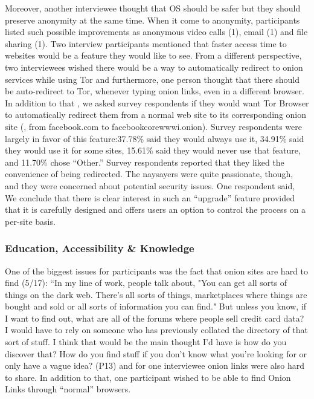 Moreover, another interviewee thought that OS should be safer but they should preserve anonymity at the same time. When it come to anonymity, participants listed such possible improvements as anonymous video calls (1), email (1) and file sharing (1). Two interview participants mentioned that faster access time to websites would be a feature they would like to see. From a different perspective, two interviewees wished there would be a way to automatically redirect to onion services while using Tor and furthermore, one person thought that there should be auto-redirect to Tor, whenever typing onion links, even in a different browser. In addition to that , we asked survey respondents if they would want Tor Browser to automatically redirect them from
a normal web site to its corresponding onion site (\eg, from facebook.com to
facebookcorewwwi.onion). Survey respondents were largely
in favor of this feature:37.78\% said they would always use it, 34.91\% said
they would use it for some sites, 15.61\% said they would never use that feature,   and
11.70\% chose ``Other.'' Survey respondents reported that they liked the convenience of being redirected.
The naysayers were quite passionate, though, and they were concerned about
potential security issues. One respondent said, 
We conclude that there is clear interest in such an ``upgrade'' feature provided
that it is carefully designed and offers users an option to control the process
on a per-site basis.


\subsubsection{Education, Accessibility \& Knowledge}

One of the biggest issues for participants was the fact that onion sites are hard to find (5/17): “In my line of work, people talk about, "You can get all sorts of things on the dark web. There's all sorts of things, marketplaces where things are bought and sold or all sorts of information you can find." But unless you know, if I want to find out, what are all of the forums where people sell credit card data? I would have to rely on someone who has previously collated the directory of that sort of stuff. I think that would be the main thought I'd have is how do you discover that? How do you find stuff if you don't know what you're looking for or only have a vague idea? (P13) and for one interviewee onion links were also hard to share.  In addition to that, one participant wished to be able to find Onion Links through “normal” browsers. 

